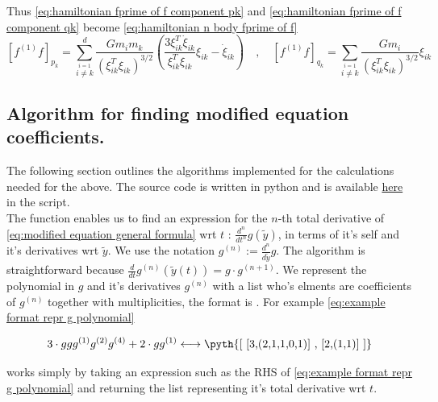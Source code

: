 \documentclass[12pt]{article}
\begin{document}
Thus \eqref{eq:hamiltonian fprime of f component pk} and \eqref{eq:hamiltonian fprime of f component qk} become \eqref{eq:hamiltonian n body fprime of f}
\begin{equation}\label{eq:hamiltonian n body fprime of f}
    \left[f^{(1)}f\right]_{p_k} = \sum_{\stackrel{i=1}{i\neq k}}^d \frac{Gm_im_k}{\left(\xi_{ik}^T\xi_{ik}\right)^{3/2}}\left( 
    \frac{3\xi_{ik}^T\dot\xi_{ik}}{\xi_{ik}^T\xi_{ik}}\xi_{ik} - \dot\xi_{ik}
    \right) \quad,\quad
    \left[ f^{(1)}f \right]_{q_k} = \sum_{\stackrel{i=1}{i\neq k}} \frac{G m_i}{\left(\xi_{ik}^T\xi_{ik}\right)^{3/2}}\xi_{ik}
\end{equation}




\subsection{Algorithm for finding modified equation coefficients.}
The following section outlines the algorithms implemented for the calculations needed for the above. The source code is written in python and is available \href{https://github.com/dcxSt/numerical_integrators/blob/master/modified_equations.py}{here} in the  script. \\

The function  enables us to find an expression for the $n$-th total derivative of \eqref{eq:modified equation general formula} wrt $t$ : $\frac{d^n}{dt^n}g(\widetilde y)$, in terms of it's self and it's derivatives wrt $\widetilde y$. We use the notation $g^{(n)}:= \frac{d^n}{d{\widetilde y}}g$. The algorithm is straightforward because $\frac{d}{dt}g^{(n)}(\widetilde y(t)) = g\cdot g^{(n+1)}$. We represent the polynomial in $g$ and it's derivatives $g^{(n)}$ with a list who's elments are coefficients of $g^{(n)}$ together with multiplicities, the format is . For example \eqref{eq:example format repr g polynomial} 

\begin{equation}\label{eq:example format repr g polynomial}
    3\cdot g g g^{(1)} g^{(2)} g^{(4)} + 2\cdot g g^{(1)} \longleftrightarrow \text{\pyth{[ [3,(2,1,1,0,1)] , [2,(1,1)] ]}}
\end{equation}

 works simply by taking an expression such as the RHS of \eqref{eq:example format repr g polynomial} and returning the list representing it's total derivative wrt $t$.\\
\end{document}
